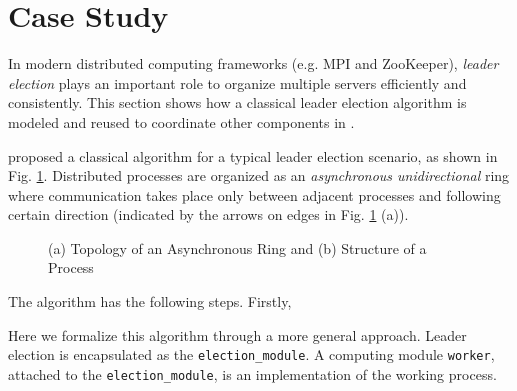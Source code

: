 \section{Case Study}
\label{sec:casestudy}

In modern distributed computing frameworks (e.g. MPI\cite{mpibook} and ZooKeeper\cite{JunqueiraZab2011}), \emph{leader election} plays an important role to organize multiple servers efficiently and consistently. This section shows how a classical leader election algorithm is modeled and reused to coordinate other components in \lang{}.

\cite{HagitDistributed2004} proposed a classical algorithm for a typical leader election scenario, as shown in Fig. \ref{fig:leaderelection}. Distributed processes are organized as an \emph{asynchronous unidirectional} ring where communication takes place only between adjacent processes and following certain direction (indicated by the arrows on edges in Fig. \ref{fig:leaderelection} (a)).

\begin{figure}
	\centering
	\resizebox{.8\textwidth}{!}{
        
    }
	\caption{(a) Topology of an Asynchronous Ring and (b) Structure of a Process}
	\label{fig:leaderelection}
\end{figure}

The algorithm has the following steps. Firstly, 

Here we formalize this algorithm through a more general approach. Leader election is encapsulated as the \texttt{election\_module}. A computing module \texttt{worker},  attached to the \texttt{election\_module}, is an implementation of the working process. 

